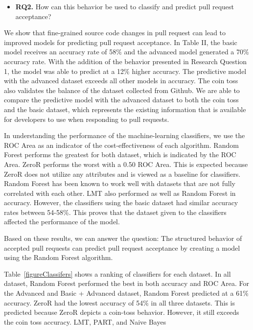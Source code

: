 \documentclass[10pt, conference]{IEEEtran}
\begin{document}
\begin{mdframed} 
\begin{itemize}
\item \textbf{RQ2.} How can this behavior be used to classify and predict pull request acceptance?
\end{itemize}
\end{mdframed}

We show that fine-grained source code changes in pull request can lead to improved models for predicting pull request acceptance. In Table II, the basic model receives an accuracy rate of 58\% and the advanced model generated a 70\% accuracy rate. With the addition of the behavior presented in Research Question 1, the model was able to predict at a 12\% higher accuracy. The predictive model with the advanced dataset exceeds all other models in accuracy. The coin toss also validates the balance of the dataset collected from Github. We are able to compare the predictive model with the advanced dataset to both the coin toss and the basic dataset, which represents the existing information that is available for developers to use when responding to pull requests.

In understanding the performance of the machine-learning classifiers, we use the ROC Area as an indicator of the cost-effectiveness of each algorithm. Random Forest performs the greatest for both dataset, which is indicated by the ROC Area. ZeroR performs the worst with a 0.50 ROC Area. This is expected because ZeroR does not utilize any attributes and is viewed as a baseline for classifiers. Random Forest has been known to work well with datasets that are not fully correlated with each other. LMT also performed as well as Random Forest in accuracy. However, the classifiers using the basic dataset had similar accuracy rates between 54-58\%. This proves that the dataset given to the classifiers affected the performance of the model.

 Based on these results, we can answer the question: The structured behavior of accepted pull requests can predict pull request acceptance by creating a model using the Random Forest algorithm.

Table~\ref{figureClassifers} shows a ranking of classifiers for each dataset. In all dataset, Random Forest performed the best in both accuracy and ROC Area. For the Advanced and Basic + Advanced dataset, Random Forest predicted at a 61\% accuracy. ZeroR had the lowest accuracy of 54\% in all three datasets. This is predicted because ZeroR depicts a coin-toss behavior. However, it still exceeds the coin toss accuracy. LMT, PART, and Naive Bayes 
\end{document}
